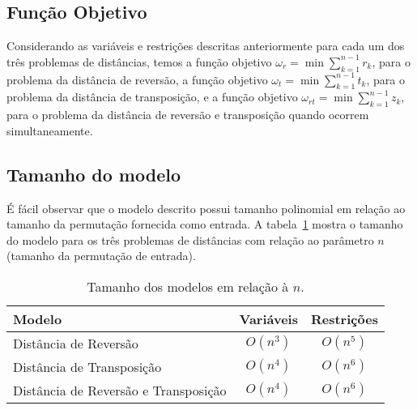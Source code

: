 \subsection{Função Objetivo}
\label{subsec:fo}
Considerando as variáveis e restrições descritas anteriormente para
cada um dos três problemas de distâncias, temos a função objetivo
$\omega_{r} = \min \sum_{k=1}^{n-1} r_{k}$, para o problema da
distância de reversão, a função objetivo $\omega_{t}
= \min \sum_{k=1}^{n-1} t_{k}$, para o problema da distância de
transposição, e a função objetivo $\omega_{rt} = \min \sum_{k=1}^{n-1}
z_{k}$, para o problema da distância de reversão e transposição quando
ocorrem simultaneamente.

\subsection{Tamanho do modelo}
\label{subsec:modelsize}
É fácil observar que o modelo descrito possui tamanho polinomial em
relação ao tamanho da permutação fornecida como entrada. A
tabela~\ref{table:modelsize} mostra o tamanho do modelo para os três
problemas de distâncias com relação ao parâmetro $n$ (tamanho da
permutação de entrada).

\begin{table}[h]
\caption{Tamanho dos modelos em relação à $n$.}
\label{table:modelsize}
\center
\begin{tabular}{|l|c|c|}
  \hline
  \textbf{Modelo} & \textbf{Variáveis} & \textbf{Restrições} \\
  \hline
  Distância de Reversão & $O(n^3)$ & $O(n^5)$ \\
  Distância de Transposição & $O(n^4)$ & $O(n^6)$ \\
  Distância de Reversão e Transposição & $O(n^4)$ & $O(n^6)$ \\
  \hline
\end{tabular}
\end{table}
